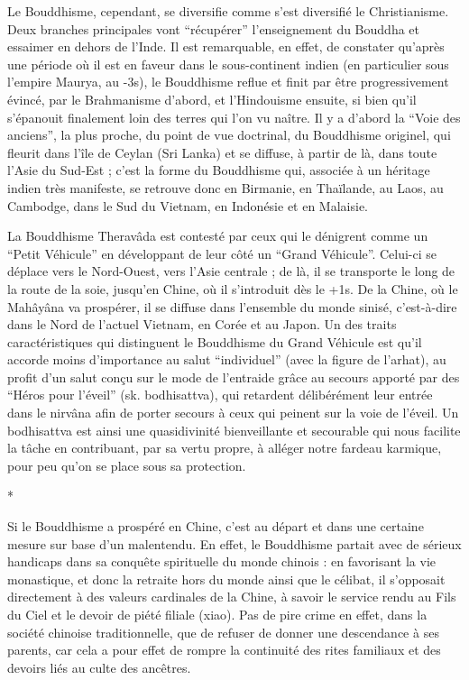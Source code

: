 Le Bouddhisme, cependant, se diversifie comme s'est diversifié le Christianisme.
Deux
branches principales vont ``récupérer'' l'enseignement du Bouddha et essaimer en dehors de l'Inde.
Il est remarquable, en effet, de constater qu'après une période où il est en
faveur dans le sous-continent indien (en particulier sous l'empire Maurya, au -3s),
le Bouddhisme reflue et finit par être progressivement évincé, par le Brahmanisme d'abord, et l'Hindouisme ensuite,
si bien qu'il s'épanouit finalement loin des terres qui l'on vu naître.
Il y a d'abord la ``Voie des anciens'', la plus
proche, du point de vue doctrinal, du Bouddhisme originel, qui fleurit dans l'île de
Ceylan (Sri Lanka) et se diffuse, à partir de là, dans toute l'Asie du Sud-Est ; c'est la
forme du Bouddhisme qui, associée à un héritage indien très manifeste, se retrouve donc
en Birmanie, en Thaïlande, au Laos, au Cambodge, dans le Sud du Vietnam, en Indonésie et en Malaisie.

La Bouddhisme Theravâda est contesté par ceux qui le dénigrent comme un ``Petit Véhicule'' en développant de leur côté un ``Grand Véhicule''.
Celui-ci se déplace vers le Nord-Ouest, vers l'Asie centrale ; de là, il se transporte le
long de la route de la soie, jusqu'en Chine, où il s'introduit dès le +1s.
De la Chine, où le Mahâyâna va prospérer, il se diffuse dans l'ensemble du monde sinisé,
c'est-à-dire dans le Nord de l'actuel Vietnam, en Corée et au Japon.
Un des traits caractéristiques qui distinguent le Bouddhisme du Grand Véhicule est qu'il accorde moins
d'importance au salut ``individuel'' (avec la figure de l'arhat), au profit d'un salut
conçu sur le mode de l'entraide grâce au secours apporté par des ``Héros pour l'éveil''
(sk. bodhisattva), qui retardent délibérément leur entrée dans le nirvâna afin de porter
secours à ceux qui peinent sur la voie de l'éveil.
Un bodhisattva est ainsi une quasidivinité bienveillante et secourable qui nous facilite la tâche en contribuant, par sa vertu
propre, à alléger notre fardeau karmique, pour peu qu'on se place sous sa protection.
\begin{center}*\end{center}
Si le Bouddhisme a prospéré en Chine, c'est au départ et dans une certaine mesure sur
base d'un malentendu.
En effet, le Bouddhisme partait avec de sérieux handicaps dans
sa conquête spirituelle du monde chinois : en favorisant la vie monastique, et donc la
retraite hors du monde ainsi que le célibat, il s'opposait directement à des valeurs cardinales de la Chine, à savoir le service rendu au Fils du Ciel et le devoir de piété filiale
(xiao).
Pas de pire crime en effet, dans la société chinoise traditionnelle, que de refuser
de donner une descendance à ses parents, car cela a pour effet de rompre la continuité
des rites familiaux et des devoirs liés au culte des ancêtres.

